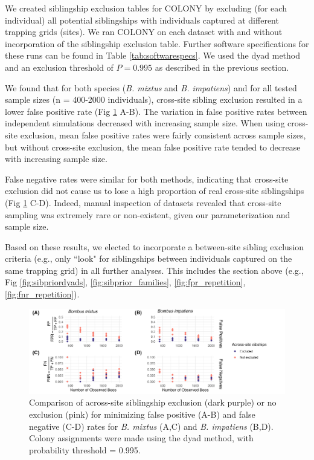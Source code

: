 \documentclass[12pt]{article}
\begin{document}
We created siblingship exclusion tables for COLONY by excluding (for each individual) all potential siblingships with individuals captured at different trapping grids (sites). We ran COLONY on each dataset with and without incorporation of the siblingship exclusion table. Further software specifications for these runs can be found in Table \ref{tab:softwarespecs}. We used the dyad method and an exclusion threshold of $P = 0.995$ as described in the previous section.

We found that for both species (\emph{B. mixtus} and \emph{B. impatiens}) and for all tested sample sizes (n = 400-2000 individuals), cross-site sibling exclusion resulted in a lower false positive rate (Fig \ref{fig:excl_size} A-B). The variation in false positive rates between independent simulations decreased with increasing sample size. When using cross-site exclusion, mean false positive rates were fairly consistent across sample sizes, but without cross-site exclusion, the mean false positive rate tended to decrease with increasing sample size.

False negative rates were similar for both methods, indicating that cross-site exclusion did not cause us to lose a high proportion of real cross-site siblingships (Fig \ref{fig:excl_size} C-D). Indeed, manual inspection of datasets revealed that cross-site sampling was extremely rare or non-existent, given our parameterization and sample size.

Based on these results, we elected to incorporate a between-site sibling exclusion criteria (e.g., only ``look" for siblingships between individuals captured on the same trapping grid) in all further analyses. This includes the section above (e.g., Fig \ref{fig:sibpriordyads}, \ref{fig:sibprior_families}, \ref{fig:fpr_repetition}, \ref{fig:fnr_repetition}).

\begin{figure}[H]
    \centering
    \includegraphics[width=\linewidth]{appendix_figures/excl_size.jpg}
    \caption{Comparison of across-site siblingship exclusion (dark purple) or no exclusion (pink) for minimizing false positive (A-B) and false negative (C-D) rates for \emph{B. mixtus} (A,C) and \emph{B. impatiens} (B,D). Colony assignments were made using the dyad method, with probability threshold = 0.995.}
    \label{fig:excl_size}
\end{figure}
\end{document}
